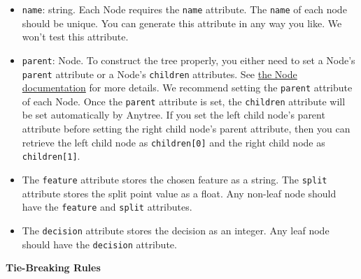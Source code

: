 \documentclass[12pt]{article}
\begin{document}
\begin{itemize}

\item \verb+name+: string. Each Node requires the \verb+name+ attribute. The \verb+name+ of each node should be unique.  You can generate this attribute in any way you like. We won't test this attribute.

\item \verb+parent+: Node. To construct the tree properly, you either need to set a Node's \verb+parent+ attribute or a Node's \verb+children+ attributes. See \href{https://anytree.readthedocs.io/en/latest/api/anytree.node.html}{the Node documentation} for more details. We recommend setting the \verb+parent+ attribute of each Node. Once the \verb+parent+ attribute is set, the \verb+children+ attribute will be set automatically by Anytree. If you set the left child node's parent attribute before setting the right child node's parent attribute, then you can retrieve the left child node as \verb+children[0]+ and the right child node as \verb+children[1]+.

\item The \verb+feature+ attribute stores the chosen feature as a string. The \verb+split+ attribute stores the split point value as a float. Any non-leaf node should have the \verb+feature+ and \verb+split+ attributes.

\item The \verb+decision+ attribute stores the decision as an integer. Any leaf node should have the \verb+decision+ attribute.

\end{itemize}

{\bf Tie-Breaking Rules}
\end{document}
